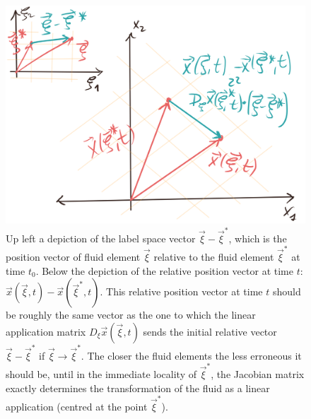 \documentclass[11pt, a4paper]{article} %
\begin{document}
\begin{figure}[h!]
  \centering
    \includegraphics[width=0.57\linewidth]{2Jacob_as_lin_app.png}
  \caption{Up left a depiction of the label space vector $\vec{\xi}-\vec{\xi}^*$, which is the position vector of fluid element $\vec{\xi}$ relative to the fluid element $\vec{\xi}^*$ at time $t_0$. Below the depiction of the relative position vector at time $t$: $\vec{x}(\vec{\xi},t)-\vec{x}(\vec{\xi}^*,t)$. This relative position vector at time $t$ should be roughly the same vector as the one to which the linear application matrix $D_\xi \vec{x}(\vec{\xi},t)$ sends the initial relative vector $\vec{\xi}-\vec{\xi}^*$ if $\vec{\xi}\rightarrow \vec{\xi}^*$. The closer the fluid elements the less erroneous it should be, until in the immediate locality of $\vec{\xi}^*$, the Jacobian matrix exactly determines the transformation of the fluid as a linear application (centred at the point $\vec{\xi}^*$). \vspace{-0.1cm} }
  \label{fig:JacobMatrix}
\end{figure}
\end{document}
